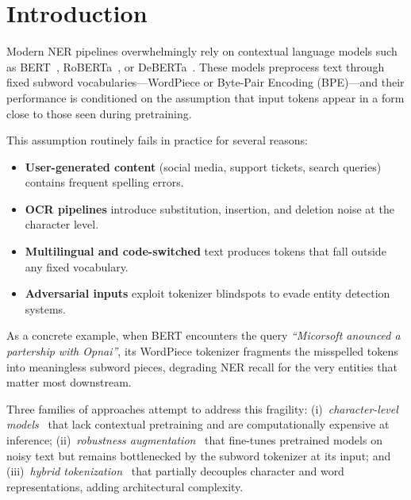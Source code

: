 \section{Introduction}
\label{sec:intro}

Modern NER pipelines overwhelmingly rely on contextual language models such
as BERT~\citep{devlin2019bert}, RoBERTa~\citep{liu2019roberta}, or
DeBERTa~\citep{he2021deberta}.  These models preprocess text through fixed
subword vocabularies---WordPiece or Byte-Pair Encoding (BPE)---and their
performance is conditioned on the assumption that input tokens appear in a
form close to those seen during pretraining.

This assumption routinely fails in practice for several reasons:

\begin{itemize}
  \item \textbf{User-generated content} (social media, support tickets, search
        queries) contains frequent spelling errors.
  \item \textbf{OCR pipelines} introduce substitution, insertion, and deletion
        noise at the character level.
  \item \textbf{Multilingual and code-switched} text produces tokens that fall
        outside any fixed vocabulary.
  \item \textbf{Adversarial inputs} exploit tokenizer blindspots to evade entity
        detection systems.
\end{itemize}

As a concrete example, when BERT encounters the query \emph{``Micorsoft
anounced a partership with Opnai''}, its WordPiece tokenizer fragments the
misspelled tokens into meaningless subword pieces, degrading NER recall for
the very entities that matter most downstream.

Three families of approaches attempt to address this fragility:
(i)~\emph{character-level models}~\citep{lample2016neural,ma2016end} that
lack contextual pretraining and are computationally expensive at inference;
(ii)~\emph{robustness augmentation}~\citep{pruthi2019combating} that
fine-tunes pretrained models on noisy text but remains bottlenecked by the
subword tokenizer at its input; and
(iii)~\emph{hybrid tokenization}~\citep{xue2022byt5,clark2022canine} that
partially decouples character and word representations, adding architectural
complexity.

